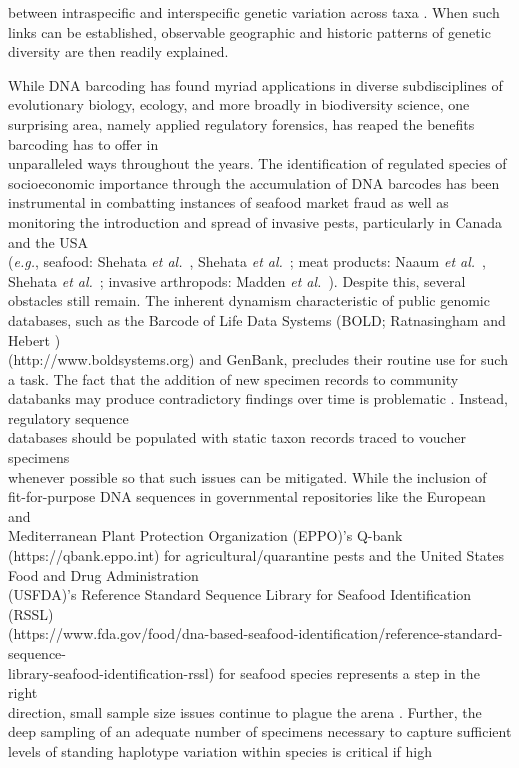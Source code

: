 between intraspecific and interspecific genetic variation across taxa \cite{phillips2019incomplete}. When such links can be established, observable geographic and historic patterns of genetic diversity are then readily explained.



While DNA barcoding has found myriad applications in diverse subdisciplines of \\ evolutionary biology, ecology, and more broadly in biodiversity science, one surprising area, namely applied regulatory forensics, has reaped the benefits barcoding has to offer in \\ unparalleled ways throughout the years. The identification of regulated species of \\ socioeconomic importance through the accumulation of DNA barcodes has been \\ instrumental in combatting instances of seafood market fraud as well as monitoring the introduction and spread of invasive pests, particularly in Canada and the USA \\ (\textit{e.g.}, seafood: Shehata \textit{et al.}~\cite{shehata2018dna}, Shehata \textit{et al.}~\cite{shehata2019survey}; meat products: Naaum \textit{et al.}~\cite{naaum2018complementary}, Shehata \textit{et al.}~\cite{shehata2019revisiting}; invasive arthropods: Madden \textit{et al.}~\cite{madden2019using}). Despite this, several obstacles still remain. The inherent dynamism characteristic of public genomic databases, such as the Barcode of Life Data Systems (BOLD; Ratnasingham and Hebert \cite{ratnasingham2007bold}) \\ (http://www.boldsystems.org) and GenBank, precludes their routine use for such a task. The fact that the addition of new specimen records to community databanks may produce contradictory findings over time is problematic \cite{phillips2020hacsim}. Instead, regulatory sequence \\ databases should be populated with static taxon records traced to voucher specimens \\ whenever possible so that such issues can be mitigated. While the inclusion of \\ fit-for-purpose DNA sequences in governmental repositories like the European and \\ Mediterranean Plant Protection Organization (EPPO)'s Q-bank (https://qbank.eppo.int) for agricultural/quarantine pests and the United States Food and Drug Administration \\ (USFDA)'s Reference Standard Sequence Library for Seafood Identification (RSSL) \\ (https://www.fda.gov/food/dna-based-seafood-identification/reference-standard-sequence-\\library-seafood-identification-rssl) for seafood species represents a step in the right \\ direction, small sample size issues continue to plague the arena \cite{phillips2020hacsim}. Further, the deep sampling of an adequate number of specimens necessary to capture sufficient levels of standing haplotype variation within species is critical if high 